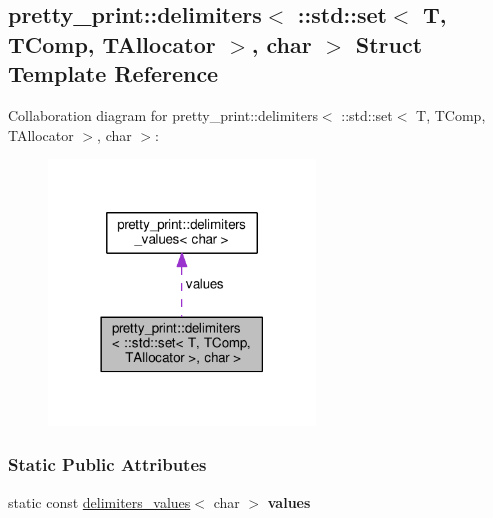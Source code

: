 \hypertarget{structpretty__print_1_1delimiters_3_01_1_1std_1_1set_3_01T_00_01TComp_00_01TAllocator_01_4_00_01char_01_4}{}\subsection{pretty\+\_\+print\+:\+:delimiters$<$ \+:\+:std\+:\+:set$<$ T, T\+Comp, T\+Allocator $>$, char $>$ Struct Template Reference}
\label{structpretty__print_1_1delimiters_3_01_1_1std_1_1set_3_01T_00_01TComp_00_01TAllocator_01_4_00_01char_01_4}


Collaboration diagram for pretty\+\_\+print\+:\+:delimiters$<$ \+:\+:std\+:\+:set$<$ T, T\+Comp, T\+Allocator $>$, char $>$\+:\nopagebreak
\begin{figure}[H]
\begin{center}
\leavevmode
\includegraphics[width=201pt]{structpretty__print_1_1delimiters_3_01_1_1std_1_1set_3_01T_00_01TComp_00_01TAllocator_01_4_00_01char_01_4__coll__graph}
\end{center}
\end{figure}
\subsubsection*{Static Public Attributes}
\begin{DoxyCompactItemize}
\item 
static const \hyperlink{structpretty__print_1_1delimiters__values}{delimiters\+\_\+values}$<$ char $>$ {\bfseries values}\hypertarget{structpretty__print_1_1delimiters_3_01_1_1std_1_1set_3_01T_00_01TComp_00_01TAllocator_01_4_00_01char_01_4_a652c5ba5a72953f2c64b08bb7c1f053c}{}\label{structpretty__print_1_1delimiters_3_01_1_1std_1_1set_3_01T_00_01TComp_00_01TAllocator_01_4_00_01char_01_4_a652c5ba5a72953f2c64b08bb7c1f053c}

\end{DoxyCompactItemize}


